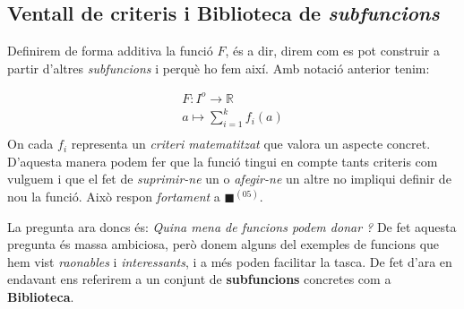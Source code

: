 \documentclass[10pt,twocolumn]{article}
\newcommand{\R}{\ensuremath{\mathbb{R}}}
\begin{document}
\subsection{Ventall de criteris i Biblioteca de \textit{subfuncions}}
Definirem de forma additiva la funció $F$, és a dir, direm com es pot construir a partir d'altres \textit{subfuncions} i perquè ho fem així. Amb notació anterior tenim:

$$
\begin{matrix}
F: I^o \longrightarrow \R \qquad \quad  \\
a\longmapsto \displaystyle \sum_{i=1}^{k}f_i(a) \\
\end{matrix}
$$
On cada $f_i$ representa un \textit{criteri matematitzat} que  valora un aspecte concret. D'aquesta manera podem fer que la funció tingui en compte tants criteris com vulguem i que el fet de \textit{suprimir-ne} un  o \textit{afegir-ne} un altre no impliqui definir de nou la funció.
Això respon \textit{fortament} a {\color{violet!60}$\blacksquare$}$^{(05)}$.

La pregunta ara doncs és: \textit{Quina mena de funcions podem donar ?} De fet aquesta pregunta és massa ambiciosa, però donem alguns del exemples de funcions que hem vist \textit{raonables} i \textit{interessants}, i a més poden facilitar la tasca. De fet d'ara en endavant ens referirem a un conjunt de \textbf{subfuncions} concretes com a \textbf{Biblioteca}.
\vspace{3mm}
\end{document}
